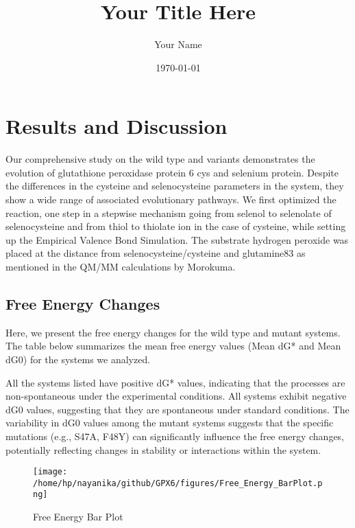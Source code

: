 \documentclass{article}
\begin{document}
\title{Your Title Here}
\author{Your Name}
\date{\today}
\maketitle

\section{Results and Discussion}

Our comprehensive study on the wild type and variants demonstrates the evolution of glutathione peroxidase protein 6 cys and selenium protein. 
Despite the differences in the cysteine and selenocysteine parameters in the system, they show a wide range of associated evolutionary pathways. 
We first optimized the reaction, one step in a stepwise mechanism going from selenol to selenolate of selenocysteine and from thiol to thiolate ion in the case of cysteine, while setting up the Empirical Valence Bond Simulation. 
The substrate hydrogen peroxide was placed at the distance from selenocysteine/cysteine and glutamine83 as mentioned in the QM/MM calculations by Morokuma.

\subsection{Free Energy Changes}

Here, we present the free energy changes for the wild type and mutant systems. The table below summarizes the mean free energy values (Mean dG* and Mean dG0) for the systems we analyzed.

All the systems listed have positive dG* values, indicating that the processes are non-spontaneous under the experimental conditions. All systems exhibit negative dG0 values, suggesting that they are spontaneous under standard conditions. The variability in dG0 values among the mutant systems suggests that the specific mutations (e.g., S47A, F48Y) can significantly influence the free energy changes, potentially reflecting changes in stability or interactions within the system.




\begin{figure}[H] %
    \centering
    \texttt{[image: /home/hp/nayanika/github/GPX6/figures/Free\_Energy\_BarPlot.png]} %
    \caption{Free Energy Bar Plot}
    \label{fig:free_energy_barplot}
\end{figure}
\end{document}
